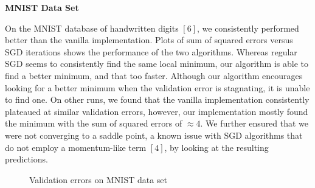 \documentclass{article}
\begin{document}
\textbf{MNIST Data Set}
\par On the MNIST database of handwritten digits $ [6] $, 
we consistently performed better than the vanilla implementation. Plots of sum of squared errors versus SGD iterations shows the performance of the two algorithms. Whereas regular SGD seems to consistently find the same local minimum, our algorithm is able to find a better minimum, and that too faster. Although our algorithm encourages looking for a better minimum when the validation error is stagnating, it is unable to find one. On other runs, we found that the vanilla implementation consistently plateaued at similar validation errors, however, our implementation mostly found the minimum with the sum of squared errors of $ \approx 4 $. We further ensured that we were not converging to a saddle point, a known issue with SGD algorithms that do not employ a momentum-like term $ [4] $, by looking at the resulting predictions.
\begin{figure}[H]
	\centering
	\quad
	\caption{Validation errors on MNIST data set}%
	\label{MNIST}%
\end{figure}
\end{document}
